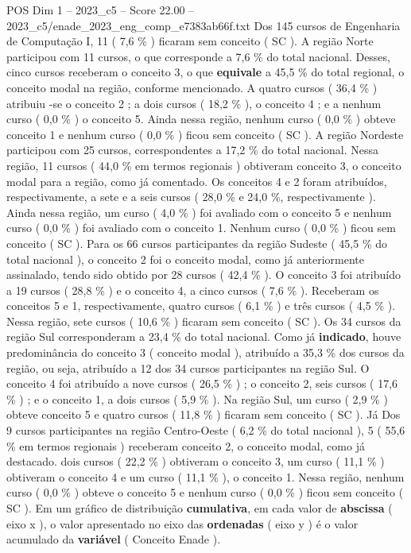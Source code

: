 \begin{textsample}{POS Dim 1 – 2023\_c5 – Score 22.00 – 2023\_c5/enade\_2023\_eng\_comp\_e7383ab66f.txt}
Dos 145 cursos de Engenharia de Computação I, 11 ( 7,6 \% ) ficaram sem conceito ( SC ).
A região Norte participou com 11 cursos, o que corresponde a 7,6 \% do total nacional.
Desses, cinco cursos receberam o conceito 3, o que \textbf{equivale} a 45,5 \% do total regional, o conceito modal na região, conforme mencionado.
A quatro cursos ( 36,4 \% ) atribuiu -se o conceito 2 ; a dois cursos ( 18,2 \% ), o conceito 4 ; e a nenhum curso ( 0,0 \% ) o conceito 5.
Ainda nessa região, nenhum curso ( 0,0 \% ) obteve conceito 1 e nenhum curso ( 0,0 \% ) ficou sem conceito ( SC ).
A região Nordeste participou com 25 cursos, correspondentes a 17,2 \% do total nacional.
Nessa região, 11 cursos ( 44,0 \% em termos regionais ) obtiveram conceito 3, o conceito modal para a região, como já comentado.
Os conceitos 4 e 2 foram atribuídos, respectivamente, a sete e a seis cursos ( 28,0 \% e 24,0 \%, respectivamente ).
Ainda nessa região, um curso ( 4,0 \% ) foi avaliado com o conceito 5 e nenhum curso ( 0,0 \% ) foi avaliado com o conceito 1.
Nenhum curso ( 0,0 \% ) ficou sem conceito ( SC ).
Para os 66 cursos participantes da região Sudeste ( 45,5 \% do total nacional ), o conceito 2 foi o conceito modal, como já anteriormente assinalado, tendo sido obtido por 28 cursos ( 42,4 \% ).
O conceito 3 foi atribuído a 19 cursos ( 28,8 \% ) e o conceito 4, a cinco cursos ( 7,6 \% ).
Receberam os conceitos 5 e 1, respectivamente, quatro cursos ( 6,1 \% ) e três cursos ( 4,5 \% ).
Nessa região, sete cursos ( 10,6 \% ) ficaram sem conceito ( SC ).
Os 34 cursos da região Sul corresponderam a 23,4 \% do total nacional.
Como já \textbf{indicado}, houve predominância do conceito 3 ( conceito modal ), atribuído a 35,3 \% dos cursos da região, ou seja, atribuído a 12 dos 34 cursos participantes na região Sul.
O conceito 4 foi atribuído a nove cursos ( 26,5 \% ) ; o conceito 2, seis cursos ( 17,6 \% ) ; e o conceito 1, a dois cursos ( 5,9 \% ).
Na região Sul, um curso ( 2,9 \% ) obteve conceito 5 e quatro cursos ( 11,8 \% ) ficaram sem conceito ( SC ).
Já Dos 9 cursos participantes na região Centro-Oeste ( 6,2 \% do total nacional ), 5 ( 55,6 \% em termos regionais ) receberam conceito 2, o conceito modal, como já destacado. dois cursos ( 22,2 \% ) obtiveram o conceito 3, um curso ( 11,1 \% ) obtiveram o conceito 4 e um curso ( 11,1 \% ), o conceito 1.
Nessa região, nenhum curso ( 0,0 \% ) obteve o conceito 5 e nenhum curso ( 0,0 \% ) ficou sem conceito ( SC ).
Em um gráfico de distribuição \textbf{cumulativa}, em cada valor de \textbf{abscissa} ( eixo x ), o valor apresentado no eixo das \textbf{ordenadas} ( eixo y ) é o valor acumulado da \textbf{variável} ( Conceito Enade ).

\end{textsample}
